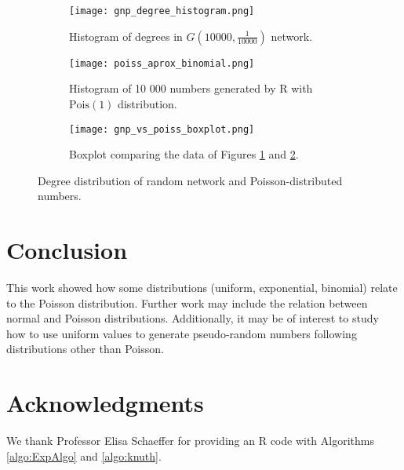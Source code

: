 \documentclass[letterpaper, 10 pt, conference]{article}
\begin{document}
\begin{figure}
	\centering
	\begin{subfigure}[b]{0.45\linewidth}
		\texttt{[image: gnp\_degree\_histogram.png]}
		\caption{Histogram of degrees in $G(10 000, \frac{1}{10 000})$ network.}
		\label{fig:gnp_degree_histogram}
	\end{subfigure}
	\hfill
	\begin{subfigure}[b]{0.45\linewidth}
		\texttt{[image: poiss\_aprox\_binomial.png]}
		\caption{Histogram of 10 000 numbers generated by R with $\mathrm{Pois}(1)$ distribution.}
		\label{fig:poiss_aprox_binomial}
	\end{subfigure}
	\begin{subfigure}[b]{0.45\linewidth}
		\texttt{[image: gnp\_vs\_poiss\_boxplot.png]}
		\caption{Boxplot comparing the data of Figures \ref{fig:gnp_degree_histogram} and \ref{fig:poiss_aprox_binomial}.}
		\label{fig:gnp_vs_poiss_boxplot}
	\end{subfigure}
	\caption{Degree distribution of random network and Poisson-distributed numbers.} 
	\label{fig:binom_poiss}
\end{figure}

\section{Conclusion}
This work showed how some distributions (uniform, exponential, binomial) relate to the Poisson distribution. Further work may include the relation between normal and Poisson distributions. Additionally, it may be of interest to study how to use uniform values to generate pseudo-random numbers following distributions other than Poisson.

\section{Acknowledgments}
We thank Professor Elisa Schaeffer for providing an R code with Algorithms \ref{algo:ExpAlgo} and \ref{algo:knuth}.





\end{document}
